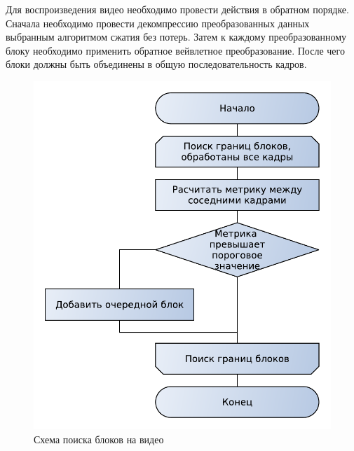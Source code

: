 Для воспроизведения видео необходимо провести действия в обратном порядке. 
Сначала необходимо провести декомпрессию преобразованных данных выбранным алгоритмом сжатия без потерь.
Затем к каждому преобразованному блоку необходимо применить обратное вейвлетное преобразование. 
После чего блоки должны быть объединены в общую последовательность кадров.

\begin{figure}[ht]
  \centering
  \includegraphics[scale=0.75]{inc/graphics/method1.pdf}
  \caption{Схема поиска блоков на видео}
  \label{fig:figblocks}
\end{figure}

